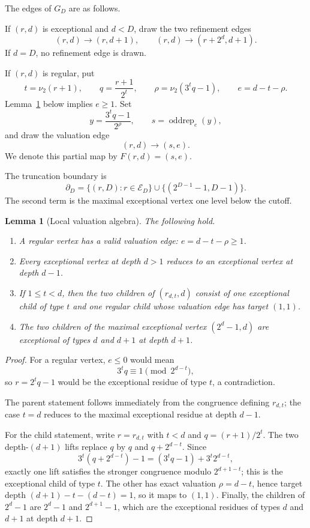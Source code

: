 \documentclass[11pt]{amsart}
\newtheorem{lemma}[theorem]{Lemma}
\theoremstyle{definition}
\theoremstyle{remark}
\newcommand{\nuu}{\nu_2}
\newcommand{\Ecal}{\mathcal E}
\newcommand{\bdD}{\partial_D}
\newcommand{\oddrep}{\operatorname{oddrep}}
\begin{document}
The edges of $G_D$ are as follows.

If $(r,d)$ is exceptional and $d<D$, draw the two refinement edges
\[
(r,d)\to(r,d+1),\qquad (r,d)\to(r+2^d,d+1).
\]
If $d=D$, no refinement edge is drawn.

If $(r,d)$ is regular, put
\[
t=\nuu(r+1),\qquad q=\frac{r+1}{2^t},\qquad
\rho=\nuu(3^tq-1),\qquad e=d-t-\rho.
\]
Lemma~\ref{lem:local} below implies $e\ge1$.  Set
\[
y=\frac{3^tq-1}{2^\rho},\qquad s=\oddrep_e(y),
\]
and draw the valuation edge
\[
(r,d)\to(s,e).
\]
We denote this partial map by $F(r,d)=(s,e)$.

The truncation boundary is
\[
\bdD=\{(r,D):r\in\Ecal_D\}\cup\{(2^{D-1}-1,D-1)\}.
\]
The second term is the maximal exceptional vertex one level below the cutoff.

\begin{lemma}[Local valuation algebra]\label{lem:local}
The following hold.
\begin{enumerate}
\item A regular vertex has a valid valuation edge: $e=d-t-\rho\ge1$.
\item Every exceptional vertex at depth $d>1$ reduces to an exceptional vertex at depth $d-1$.
\item If $1\le t<d$, then the two children of $(r_{d,t},d)$ consist of one exceptional child of type $t$ and one regular child whose valuation edge has target $(1,1)$.
\item The two children of the maximal exceptional vertex $(2^d-1,d)$ are exceptional of types $d$ and $d+1$ at depth $d+1$.
\end{enumerate}
\end{lemma}

\begin{proof}
For a regular vertex, $e\le0$ would mean
\[
3^tq\equiv1\pmod {2^{d-t}},
\]
so $r=2^tq-1$ would be the exceptional residue of type $t$, a contradiction.

The parent statement follows immediately from the congruence defining $r_{d,t}$; the case $t=d$ reduces to the maximal exceptional residue at depth $d-1$.

For the child statement, write $r=r_{d,t}$ with $t<d$ and $q=(r+1)/2^t$.  The two depth-$(d+1)$ lifts replace $q$ by $q$ and $q+2^{d-t}$.  Since
\[
3^t(q+2^{d-t})-1=(3^tq-1)+3^t2^{d-t},
\]
exactly one lift satisfies the stronger congruence modulo $2^{d+1-t}$; this is the exceptional child of type $t$.  The other has exact valuation $\rho=d-t$, hence target depth $(d+1)-t-(d-t)=1$, so it maps to $(1,1)$.  Finally, the children of $2^d-1$ are $2^d-1$ and $2^{d+1}-1$, which are the exceptional residues of types $d$ and $d+1$ at depth $d+1$.
\end{proof}
\end{document}
